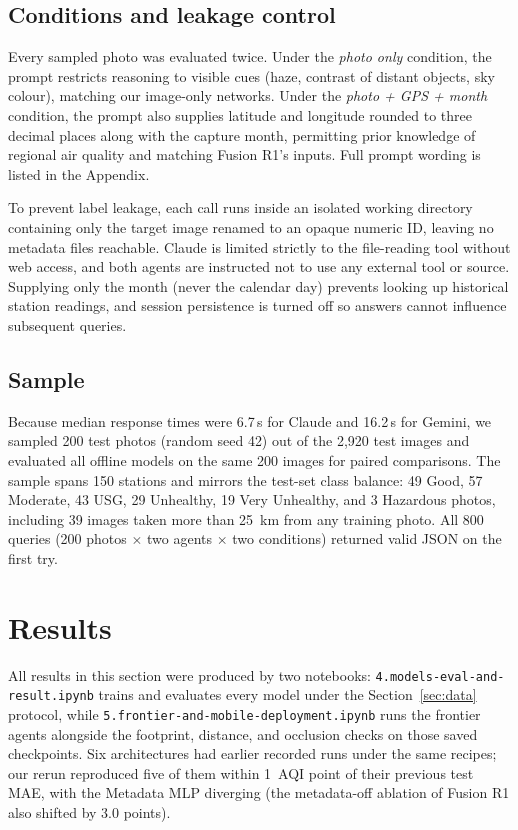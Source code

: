 \documentclass[conference]{IEEEtran}
\begin{document}
\subsection{Conditions and leakage control}
Every sampled photo was evaluated twice. Under the \emph{photo only} condition,
the prompt restricts reasoning to visible cues (haze, contrast of distant
objects, sky colour), matching our image-only networks. Under the
\emph{photo + GPS + month} condition, the prompt also supplies latitude and
longitude rounded to three decimal places along with the capture month,
permitting prior knowledge of regional air quality and matching Fusion R1's
inputs. Full prompt wording is listed in the Appendix.

To prevent label leakage, each call runs inside an isolated working directory
containing only the target image renamed to an opaque numeric ID, leaving no
metadata files reachable. Claude is limited strictly to the file-reading tool
without web access, and both agents are instructed not to use any external tool
or source. Supplying only the month (never the calendar day) prevents looking up
historical station readings, and session persistence is turned off so answers
cannot influence subsequent queries.

\subsection{Sample}
Because median response times were 6.7\,s for Claude and 16.2\,s for Gemini, we
sampled 200 test photos (random seed 42) out of the 2,920 test images and
evaluated all offline models on the same 200 images for paired comparisons. The
sample spans 150 stations and mirrors the test-set class balance: 49 Good, 57
Moderate, 43 USG, 29 Unhealthy, 19 Very Unhealthy, and 3 Hazardous photos,
including 39 images taken more than 25~km from any training photo. All 800
queries (200 photos $\times$ two agents $\times$ two conditions) returned valid
JSON on the first try.

\section{Results}\label{sec:results}

All results in this section were produced by two notebooks:
\texttt{4.models-eval-and-result.ipynb} trains and evaluates every model under
the Section~\ref{sec:data} protocol, while
\texttt{5.frontier-and-mobile-deployment.ipynb} runs the frontier agents
alongside the footprint, distance, and occlusion checks on those saved
checkpoints. Six architectures had earlier recorded runs under the same
recipes; our rerun reproduced five of them within 1~AQI point of their previous
test MAE, with the Metadata MLP diverging (the metadata-off ablation of Fusion
R1 also shifted by 3.0 points).
\end{document}
